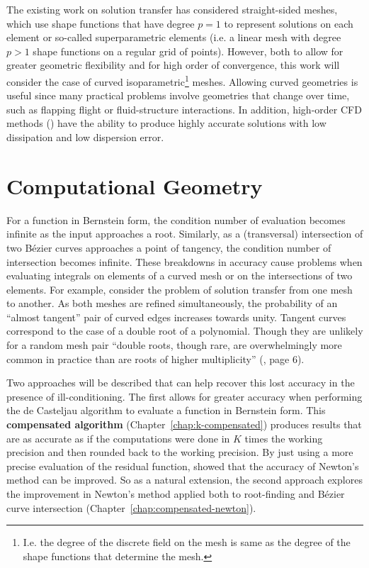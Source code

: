 The existing work on solution transfer has considered straight-sided meshes,
which use shape functions that have degree \(p = 1\) to represent solutions
on each element or so-called superparametric elements (i.e. a linear mesh
with degree \(p > 1\) shape functions on a regular grid of points).
However, both to allow for greater geometric flexibility
and for high order of convergence, this work will consider the case
of curved isoparametric\footnote{I.e. the degree of the discrete field on the
mesh is same as the degree of the shape functions that determine the
mesh.} meshes. Allowing curved geometries is useful since many practical
problems involve geometries that change over time, such as flapping flight
or fluid-structure interactions. In addition, high-order CFD methods
(\cite{Wang2013}) have the ability to produce highly accurate solutions
with low dissipation and low dispersion error.

\section{Computational Geometry}

For a function in Bernstein form, the condition number of evaluation
becomes infinite as the input approaches a root. Similarly,
as a (transversal) intersection of two B\'{e}zier curves approaches a
point of tangency, the condition number of intersection becomes
infinite. These breakdowns in accuracy cause problems when evaluating
integrals on elements of a curved mesh or on the intersections of two
elements. For example, consider the problem of solution transfer from
one mesh to another. As both meshes are refined simultaneously, the
probability of an ``almost tangent'' pair of curved edges increases
towards unity. Tangent curves correspond to the case of a double root
of a polynomial. Though they are unlikely for a random mesh pair
``double roots, though rare, are overwhelmingly more common in practice
than are roots of higher multiplicity'' (\cite{Kahan1972}, page 6).

Two approaches will be described that can help recover this lost accuracy
in the presence of ill-conditioning. The first allows for greater
accuracy when performing the de Casteljau algorithm to evaluate
a function in Bernstein form. This \textbf{compensated algorithm}
(Chapter~\ref{chap:k-compensated}) produces results that are as accurate as if
the computations were done in \(K\) times the working precision
and then rounded back to the working precision. By just using a
more precise evaluation of the residual function,
\cite{Tisseur2001} showed that the accuracy of Newton's method can
be improved. So as a natural extension, the second approach
explores the improvement in Newton's method applied both to
root-finding and B\'{e}zier curve intersection
(Chapter~\ref{chap:compensated-newton}).


